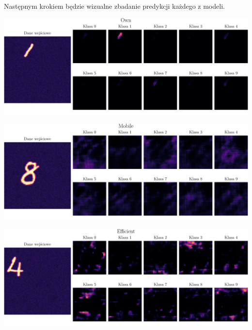 \documentclass[10pt]{article}
\begin{document}
\begin{center}
  
  \label{table:loss}
\end{center}


\noindent
Następnym krokiem będzie wizualne zbadanie predykcji każdego z modeli.

\begin{center}
  \includegraphics[width=0.9\linewidth]{figures/own.pdf}
  \label{fig:own_resp}
\end{center}

\begin{center}
  \includegraphics[width=0.9\linewidth]{figures/mobile.pdf}
  \label{fig:mobile_resp}
\end{center}

\begin{center}
  \includegraphics[width=0.9\linewidth]{figures/efficient.pdf}
  \label{fig:efficient_resp}
\end{center}
\end{document}
